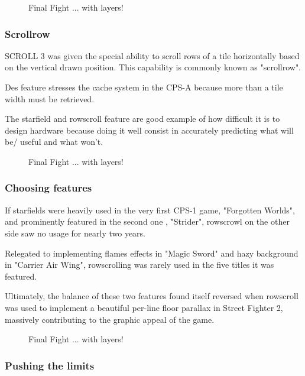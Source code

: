 \vfill
\begin{figure}[!b]
 \caption*{Final Fight ... with layers!}%
 \end{figure}%
\pagebreak

\subsubsection{Scrollrow}
SCROLL 3 was given the special ability to scroll rows of a tile horizontally based on the vertical drawn position. This capability is commonly known as "scrollrow".

Des feature stresses the cache system in the CPS-A because more than a tile width must be retrieved.

The starfield and rowscroll feature are good example of how difficult it is to design hardware because doing it well consist in accurately predicting what will be/ useful and what won't. 

\vfill
\begin{figure}[!b]
 \caption*{Final Fight ... with layers!}%
 \end{figure}%
\pagebreak


\subsubsection{Choosing features}


If starfields were heavily used in the very first CPS-1 game, "Forgotten Worlds", and prominently featured in the second one , "Strider", rowscrowl on the other side saw no usage for nearly two years. 

Relegated to implementing flames effects in "Magic Sword" and hazy background in "Carrier Air Wing", rowscrolling was rarely used in the five titles\cite{mame_cps1_video} it was featured.

Ultimately, the balance of these two features found itself reversed when rowscroll was used to implement a beautiful per-line floor parallax in Street Fighter 2, massively contributing to the graphic appeal of the game.


\vfill
\begin{figure}[!b]
 \caption*{Final Fight ... with layers!}%
 \end{figure}%
\pagebreak







\subsubsection{Pushing the limits}

